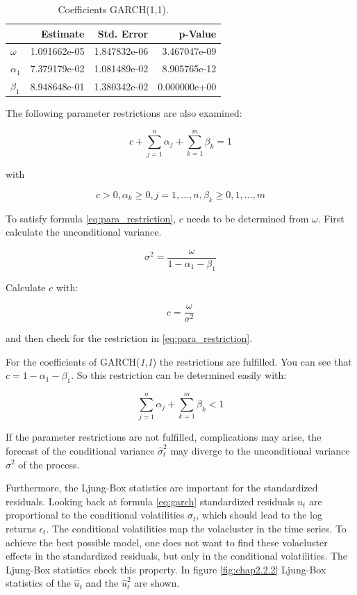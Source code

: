 \documentclass[
]{article}
\begin{document}
\begin{table}

\caption{\label{tab:coeftable}Coefficients GARCH(1,1).}
\centering
\begin{tabular}[t]{lrrr}
\toprule
  & Estimate & Std. Error & p-Value\\
\midrule
$\omega$ & 1.091662e-05 & 1.847832e-06 & 3.467047e-09\\
$\alpha_{1}$ & 7.379179e-02 & 1.081489e-02 & 8.905765e-12\\
$\beta_{1}$ & 8.948648e-01 & 1.380342e-02 & 0.000000e+00\\
\bottomrule
\end{tabular}
\end{table}

The following parameter restrictions are also examined:

\begin{equation} \label{eq:para_restriction}
  c+\sum_{j=1}^{n}\alpha_{j}+\sum_{k=1}^{m}\beta_{k}=1
\end{equation}

with

\[c>0, \alpha_{k}\geq0, j=1,...,n, \beta_{k}\geq0, 1,...,m \]

To satisfy formula \ref{eq:para_restriction}, \(c\) needs to be
determined from \(\omega\). First calculate the unconditional variance.

\[\sigma^{2} = \frac{\omega}{1-\alpha_{1}-\beta_{1}}\]

Calculate \(c\) with:

\[c=\frac{\omega}{\sigma^{2}}\]

and then check for the restriction in \ref{eq:para_restriction}.

For the coefficients of GARCH(\emph{1},\emph{1}) the restrictions are
fulfilled. You can see that \(c = 1-\alpha_{1}-\beta_{1}\). So this
restriction can be determined easily with:

\begin{equation} \label{eq:para_moments_easy}
  \sum_{j=1}^{n}\alpha_{j}+\sum_{k=1}^{m}\beta_{k} < 1
\end{equation}

If the parameter restrictions are not fulfilled, complications may
arise, the forecast of the conditional variance \(\hat{\sigma}^{2}_{t}\)
may diverge to the unconditional variance \(\sigma^{2}\) of the process.

\newpage

Furthermore, the Ljung-Box statistics are important for the standardized
residuals. Looking back at formula \ref{eq:garch} standardized residuals
\(u_{t}\) are proportional to the conditional volatilities
\(\sigma_{t}\), which should lead to the log returns \(\epsilon_{t}\).
The conditional volatilities map the volacluster in the time series. To
achieve the best possible model, one does not want to find these
volacluster effects in the standardized residuals, but only in the
conditional volatilities. The Ljung-Box statistics check this property.
In figure \ref{fig:chap2.2.2} Ljung-Box statistics of the
\(\hat{u}_{t}\) and the \(\hat{u}^{2}_{t}\) are shown.
\end{document}
